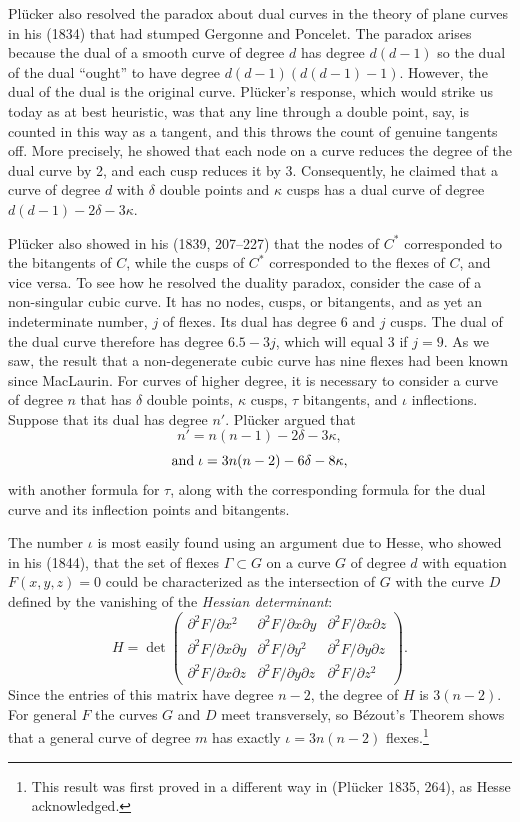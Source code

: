 Pl\"ucker also resolved the paradox about dual curves in the theory of plane curves in his (1834) that had stumped Gergonne and Poncelet. The paradox arises because the dual of a smooth curve of degree $d$ has degree $d(d-1)$
so the dual of the dual ``ought'' to have degree $d(d-1)(d(d-1)-1)$. However, the dual of the dual is the original curve.  
Pl\"ucker's response, which would strike us today as at best heuristic, was that any line through a double point, say, is counted in this way as a tangent, and this throws the count of genuine tangents off. More precisely, he  showed that each node on a curve reduces the degree of the dual curve by 2, and each cusp reduces it by 3. Consequently, he claimed that  a curve of degree $d$ with $\delta$ double points and $\kappa$ cusps has a dual curve  of degree $d(d-1) -  2\delta - 3\kappa.$ 




Pl\"ucker also showed in his (1839, 207--227) that the nodes of $C^{*}$  corresponded to the bitangents of $C$, while the cusps of $C^{*}$ corresponded to the flexes of $C$, and vice versa. To see how he resolved the duality paradox, consider  the case of a non-singular cubic curve. It has no nodes, cusps, or bitangents, and as yet an indeterminate number, $j$ of flexes. Its dual has degree 6 and $j$ cusps. The dual of the dual curve therefore has degree $6.5 - 3j$, which will equal 3 if $j = 9.$ As we saw, the result that a non-degenerate cubic curve has nine flexes had been known since MacLaurin. For curves of higher degree, it is necessary to consider a curve of degree $n$ that has $\delta$ double points, $\kappa$ cusps, $\tau$ bitangents, and $\iota$ inflections. Suppose that its dual has degree $n'$. Pl\"ucker argued that
\[n' = n(n-1) - 2\delta - 3 \kappa,\]
\[{\rm and}\; \iota = 3n(n-2) - 6\delta - 8\kappa,\]
with another formula for $\tau$, along with the corresponding formula for the dual curve and its inflection points and bitangents.

The number $\iota$ is most easily found using an argument due to Hesse, who showed  in his (1844),  that the set of flexes $\Gamma\subset G$ on a curve $G$ of degree $d$ with equation $F(x, y, z) = 0$ could be characterized as the intersection of $G$  with the curve $D$ defined by the vanishing of the \emph{Hessian determinant}:
$$
H = \det \begin{pmatrix}
 \partial^{2}F/\partial x^{2} &\partial^{2}F/\partial x\partial y &\partial^{2}F/\partial x\partial z \\
\partial^{2}F/\partial x\partial y  &\partial^{2}F/\partial y^{2} &\partial^{2}F/\partial y\partial z \\
\partial^{2}F/\partial x\partial z &\partial^{2}F/\partial y\partial z &\partial^{2}F/\partial z^{2} 
\end{pmatrix}.
$$
Since the entries of this matrix have degree $n-2$, the degree of $H$ is $3(n-2).$ For general $F$ the curves $G$ and $D$ meet transversely, so B\'ezout's Theorem shows that a general curve of degree $m$ has exactly $\iota = 3n(n-2)$ flexes.\footnote{This result was first proved in a different way in (Pl\"ucker 1835, 264), as Hesse acknowledged.}

